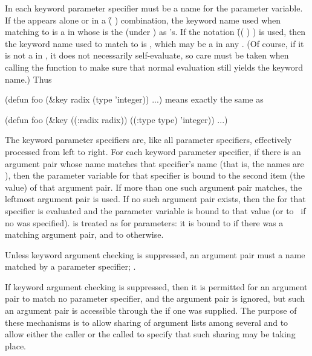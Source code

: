 In each keyword parameter specifier must be a name  for
the parameter variable.
If the  appears alone or in a \f{( )}
combination, the keyword name used when matching  to 
is a  in  whose  is the
 (under ) as 's.
If the notation \f{(( ) )} is used,
then the keyword name used to match  to  is
, which may be a  in any .
(Of course, if it is not a  in ,
it does not necessarily self-evaluate, so care must be taken when calling the function
to make sure that normal evaluation still yields the keyword name.)
Thus

\code
 (defun foo (&key radix (type 'integer)) ...)
\endcode
means exactly the same as

\code
 (defun foo (&key ((:radix radix)) ((:type type) 'integer)) ...)
\endcode

The keyword parameter specifiers are, like all parameter specifiers,
effectively processed from left to right.  For each keyword parameter
specifier, if there is an argument pair whose name matches that
specifier's name (that is, the names are ), then the
parameter variable for that specifier is bound to the second item (the
value) of that argument pair.  If more than one such argument pair
matches, the leftmost argument pair is used.  If no such argument pair
exists, then the  for that specifier is evaluated and
the parameter variable is bound to that value (or to \nil\ if no
 was specified).   is
treated as for  parameters: it is bound to  if there
was a matching argument pair, and to  otherwise.

Unless keyword argument checking is suppressed,
an argument pair must a name matched by a parameter specifier;
\seesection\UnrecognizedKeyArgs.

If keyword argument checking is suppressed, 
then it is permitted for an argument pair
to match no parameter specifier, and the argument pair is ignored, but
such an argument pair is accessible through the  if
one was supplied.  The purpose of these mechanisms is to allow sharing
of argument lists among several  and to
allow either the caller or the called  to
specify that such sharing may be taking place.

